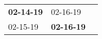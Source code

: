 \begin{supertabular}{p{0.33\columnwidth}p{0.33\columnwidth}p{0.33\columnwidth}}
 \textbf{02-14-19\textsuperscript{}} &           02-16-19\textsuperscript{} \\
          02-15-19\textsuperscript{} &  \textbf{02-16-19\textsuperscript{}} \\
\end{supertabular}
